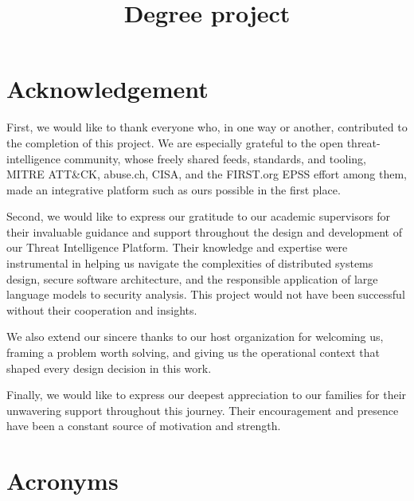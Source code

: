 \documentclass[a4paper,12pt]{report}
\title{Degree project}
\begin{document}


\newpage
\chapter*{Acknowledgement}

First, we would like to thank everyone who, in one way or another, contributed to the completion of this project. We are especially grateful to the open threat-intelligence community, whose freely shared feeds, standards, and tooling, MITRE ATT\&CK, abuse.ch, CISA, and the FIRST.org EPSS effort among them, made an integrative platform such as ours possible in the first place.\hfill\break

Second, we would like to express our gratitude to our academic supervisors for their invaluable guidance and support throughout the design and development of our Threat Intelligence Platform. Their knowledge and expertise were instrumental in helping us navigate the complexities of distributed systems design, secure software architecture, and the responsible application of large language models to security analysis. This project would not have been successful without their cooperation and insights.\hfill\break

We also extend our sincere thanks to our host organization for welcoming us, framing a problem worth solving, and giving us the operational context that shaped every design decision in this work.\hfill\break

Finally, we would like to express our deepest appreciation to our families for their unwavering support throughout this journey. Their encouragement and presence have been a constant source of motivation and strength.
\hfill\break

\newpage
\chapter*{Acronyms}


\newpage
\end{document}
